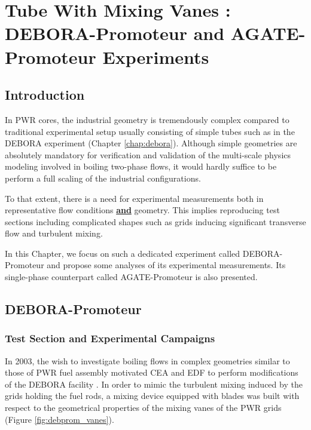 
\chapter{Tube With Mixing Vanes : DEBORA-Promoteur and AGATE-Promoteur Experiments} %

\minitoc

\label{ch:debora_agate_prom} %

\section{Introduction}

In PWR cores, the industrial geometry is tremendously complex compared to traditional experimental setup usually consisting of simple tubes such as in the DEBORA experiment (Chapter \ref{chap:debora}). Although simple geometries are absolutely mandatory for verification and validation of the multi-scale physics modeling involved in boiling two-phase flows, it would hardly suffice to be perform a full scaling of the industrial configurations. 

\npar

To that extent, there is a need for experimental measurements both in representative flow conditions \textbf{\underline{and}} geometry. This implies reproducing test sections including complicated shapes such as grids inducing significant transverse flow and turbulent mixing. 

\npar

In this Chapter, we focus on such a dedicated experiment called DEBORA-Promoteur and propose some analyses of its experimental measurements. Its single-phase counterpart called AGATE-Promoteur is also presented.



\section{DEBORA-Promoteur}
\label{sec:deb_prom_desc}

\subsection{Test Section and Experimental Campaigns}

In 2003, the wish to investigate boiling flows in complex geometries similar to those of PWR fuel assembly motivated CEA and EDF to perform modifications of the DEBORA facility \cite{falk_debprom}. In order to mimic the turbulent mixing induced by the grids holding the fuel rods, a mixing device equipped with blades was built with respect to the geometrical properties of the mixing vanes of the PWR grids (Figure \ref{fig:debprom_vanes}).


